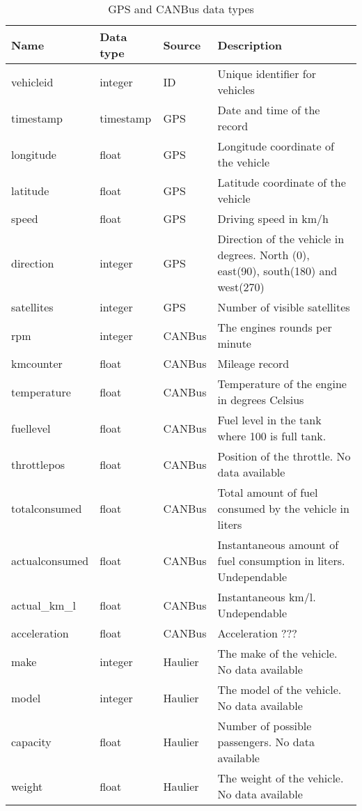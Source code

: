 \begin{table}[bt]
\begin{tabular}{|l|l|l|l|}\hline
Name & Data type & Source & Description\\\hline
vehicleid & integer & ID & Unique identifier for vehicles\\\hline
timestamp & timestamp & GPS & Date and time of the record\\\hline
longitude & float & GPS & Longitude coordinate of the vehicle\\\hline
latitude & float & GPS & Latitude coordinate of the vehicle\\\hline
speed & float & GPS & Driving speed in km/h\\\hline
direction & integer & GPS & Direction of the vehicle in degrees. North (0), east(90), south(180) and west(270)\\\hline
satellites & integer & GPS & Number of visible satellites\\\hline
rpm & integer & CANBus & The engines rounds per minute\\\hline
kmcounter & float & CANBus & Mileage record\\\hline
temperature & float & CANBus & Temperature of the engine in degrees Celsius\\\hline
fuellevel& float & CANBus & Fuel level in the tank where 100 is full tank.\\\hline
throttlepos & float & CANBus & Position of the throttle. No data available\\\hline
totalconsumed & float & CANBus & Total amount of fuel consumed by the vehicle in liters\\\hline
actualconsumed & float & CANBus & Instantaneous amount of fuel consumption in liters. Undependable\\\hline
actual\_km\_l & float & CANBus & Instantaneous km/l. Undependable\\\hline
acceleration & float & CANBus & Acceleration ???\\\hline %
make & integer & Haulier &The make of the vehicle. No data available\\\hline
model & integer & Haulier &The model of the vehicle. No data available\\\hline
capacity & float & Haulier & Number of possible passengers. No data available\\\hline
weight & float & Haulier & The weight of the vehicle. No data available\\\hline
\end{tabular}
\caption{GPS and CANBus data types}\label{tb:dataDescription}
\end{table}